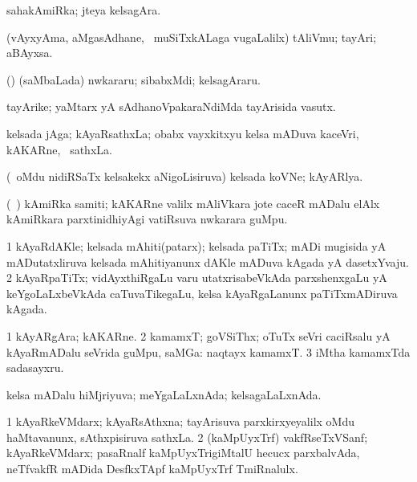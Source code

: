 {{{{{{\begin{center}
\bentry
{} 
\gl{\nA}
\expl{}
\bmng
sahakAmiRka; jteya kelsagAra. 
\emng
\eentry

\bentry
{} 
\gl{\nA}
\expl{}
\bmng
(vAyxyAma, aMgasAdhane, \kanmu\ muSiTxkALaga \mo vugaLalilx) tAliVmu; tayAri; aBAyxsa. 
\emng
\eentry

\bentry
{} 
\gl{\nA}
\expl{}
\bmng
(\bava) (saMbaLada) nwkararu; sibabxMdi; kelsagAraru. 
\emng
\eentry

\bentry
{} 
\gl{\nA}
\expl{}
\bmng
tayArike; yaMtarx yA sAdhanoVpakaraNdiMda tayArisida vasutx. 
\emng
\eentry

\bentry 
{} 
\gl{\nA}
\expl{}
\bmng
kelsada jAga; kAyaRsathxLa; obabx vayxkitxyu kelsa mADuva kaceVri, kAKARne, \mo\ sathxLa. 
\emng
\eentry

\bentry
{} 
\gl{\nA}
\expl{}
\bmng
(\kanmu\ oMdu nidiRSaTx kelsakekx aNigoLisiruva) kelsada koVNe; kAyARlya. 
\emng
\eentry

\bentry
{} 
\gl{\nA}
\expl{}
\bmng
(\kanmu\ \birx) kAmiRka samiti; kAKARne \mo valilx mAliVkara jote caceR mADalu elAlx kAmiRkara parxtinidhiyAgi vatiRsuva nwkarara guMpu. 
\emng
\eentry

\bentry
{} 
\gl{\nA}
\expl{}
\bmng
\bnum
\num{1} kAyaRdAKle; kelsada mAhiti(patarx); kelsada paTiTx; mADi mugisida yA mADutatxliruva kelsada mAhitiyanunx dAKle mADuva kAgada yA dasetxYvaju. 
\num{2} kAyaRpaTiTx; vidAyxthiRgaLu \mo varu utatxrisabeVkAda parxshenxgaLu yA keYgoLaLxbeVkAda caTuvaTikegaLu, kelsa kAyaRgaLanunx paTiTxmADiruva kAgada. 
\enum
\emng
\eentry

\bentry
{} 
\gl{\nA}
\expl{}
\bmng
\bnum
\num{1} kAyARgAra; kAKARne. 
\num{2} kamamxT; goVSiThx; oTuTx seVri caciRsalu yA kAyaRmADalu seVrida guMpu, saMGa:  naqtayx kamamxT. 
\num{3} iMtha kamamxTda sadasayxru. 
\enum
\emng
\eentry

\bentry
{} 
\gl{\gu}
\expl{}
\bmng
kelsa mADalu hiMjriyuva; meYgaLaLxnAda; kelsagaLaLxnAda. 
\emng
\eentry

\bentry
{} 
\gl{\nA}
\expl{}
\bmng
\bnum
\num{1} kAyaRkeVMdarx; kAyaRsAthxna; tayArisuva parxkirxyeyalilx oMdu haMtavanunx, sAthxpisiruva sathxLa. 
\num{2} (kaMpUyxTrf) vakfRseTxVSanf; kAyaRkeVMdarx; pasaRnalf kaMpUyxTrigiMtalU hecucx parxbalvAda, neTfvakfR mADida DesfkxTApf kaMpUyxTrf TmiRnalulx. 
\enum
\emng
\eentry


\end{center}}}}}}}
